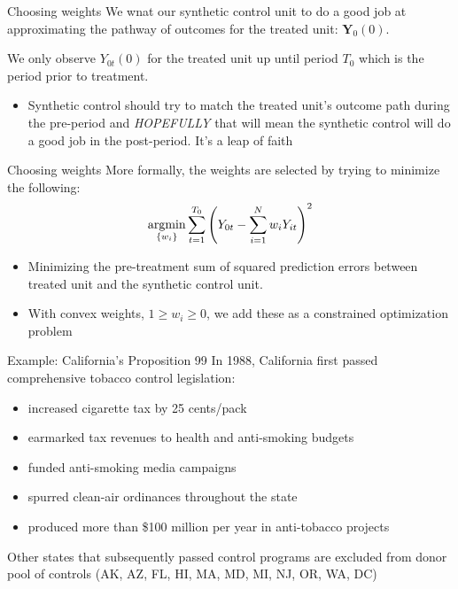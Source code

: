 \documentclass[t]{beamer}
\begin{document}
\begin{frame}{Choosing weights}
  We wnat our synthetic control unit to do a good job at approximating the pathway of outcomes for the treated unit: $\bm{Y}_0(0)$.

  \pause
  \bigskip
  We only observe $Y_{0t}(0)$ for the treated unit up until period $T_0$ which is the period prior to treatment. 
  \begin{itemize}
    \item Synthetic control should try to match the treated unit's outcome path during the pre-period and \emph{HOPEFULLY} that will mean the synthetic control will do a good job in the post-period. It's a leap of faith
  \end{itemize}
\end{frame}

\begin{frame}{Choosing weights}
  More formally, the weights are selected by trying to minimize the following:
  $$
    \operatorname*{argmin}_{ \{ w_i \} } \sum_{t=1}^{T_0} \left( Y_{0t} - \sum_{i=1}^N w_i Y_{it} \right)^2
  $$
  \begin{itemize}
    \item Minimizing the pre-treatment sum of squared prediction errors between treated unit and the synthetic control unit.
    \item With convex weights, $1 \geq w_i \geq 0$, we add these as a constrained optimization problem
  \end{itemize}
\end{frame}


\begin{frame}{Example: California's Proposition 99}
	In 1988, California first passed comprehensive tobacco control legislation:
  \begin{itemize}
		\item increased cigarette tax by 25 cents/pack
		\item earmarked tax revenues to health and anti-smoking budgets
		\item funded anti-smoking media campaigns
		\item spurred clean-air ordinances throughout the state
		\item produced more than \$100 million per year in anti-tobacco projects
  \end{itemize}
	
  \bigskip Other states that subsequently passed control programs are excluded from donor pool of controls (AK, AZ, FL, HI, MA, MD, MI, NJ, OR, WA, DC)
\end{frame}
\end{document}
